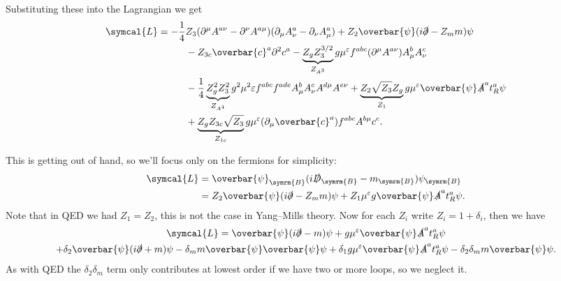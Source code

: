 \documentclass[fleqn]{NotesClass}
\newcommand{\diracadjoint}[1]{\overbar{#1}}
\newcommand{\covariantDerivative}{D}
\newcommand{\lagrangianDensity}{\symcal{L}}
\newcommand{\dalembertian}{\partial^2}
\newcommand{\bare}{\symrm{B}}
\begin{document}
    Substituting these into the Lagrangian we get
    \begin{align}
        \lagrangianDensity = -\frac{1}{4}&Z_3(\partial^\mu A^{a\nu} - \partial^\nu A^{a\mu})(\partial_\mu A_\nu^a - \partial_\nu A_\mu^a) + Z_2\diracadjoint{\psi}(i\slashed{\partial} - Z_mm)\psi \\
        &- Z_{3c}\diracadjoint{c}^a\dalembertian c^a - \underbrace{Z_gZ_3^{3/2}}_{Z_{A^3}} g\mu^\varepsilon f^{abc}(\partial^\mu A^{a\nu})A^b_\mu A^c_\nu \notag\\
        &- \frac{1}{4}\underbrace{Z_g^2 Z_3^2}_{Z_{A^4}} g^2 \mu^2 \varepsilon f^{abc}f^{ade}A^b_\mu A^c_\nu A^{d\mu} A^{e\nu} + \underbrace{Z_2\sqrt{Z_3}Z_g}_{Z_1} g\mu^\varepsilon \diracadjoint{\psi} \slashed{A}^a t_R^a \psi \notag\\
        &+ \underbrace{Z_gZ_{3c}\sqrt{Z_3}}_{Z_{1c}} g\mu^\varepsilon (\partial_\mu \diracadjoint{c}^a) f^{abc}A^{b\mu}c^c. \notag
    \end{align}
    
    This is getting out of hand, so we'll focus only on the fermions for simplicity:
    \begin{align}
        \lagrangianDensity &= \diracadjoint{\psi}_{\bare}(i\slashed{\covariantDerivative}_{\bare} - m_{\bare})\psi_{\bare}\\
        &= Z_2\diracadjoint{\psi}(i\slashed{\partial} - Z_m m)\psi + Z_1\mu^\varepsilon g\diracadjoint{\psi}\slashed{A}^a t_R^a \psi.
    \end{align}
    Note that in QED we had \(Z_1 = Z_2\), this is not the case in Yang--Mills theory.
    Now for each \(Z_i\) write \(Z_i = 1 + \delta_i\), then we have
    \begin{multline}
        \lagrangianDensity = \diracadjoint{\psi}(i\slashed{\partial} - m)\psi + g\mu^\varepsilon \diracadjoint{\psi}\slashed{A}^a t_R^a \psi\\
        + \delta_2 \diracadjoint{\psi}(i\slashed{\partial} + m)\psi - \delta_m m \diracadjoint{\psi} \diracadjoint{\psi}\psi + \delta_1 g\mu^\varepsilon \diracadjoint{\psi}\slashed{A}^a t_R^a \psi - \delta_2 \delta_m m\diracadjoint{\psi}\psi.
    \end{multline}
    As with QED the \(\delta_2 \delta_m\) term only contributes at lowest order if we have two or more loops, so we neglect it.
    
\end{document}
